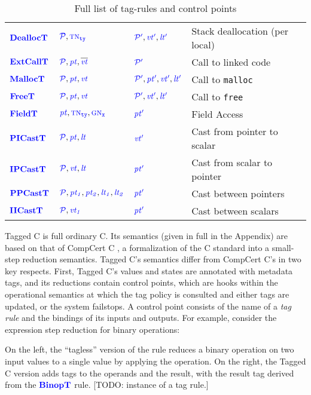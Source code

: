 \documentclass{llncs}
\begin{document}
\begin{table}[t]
\begin{tabular}{|l|l|l|l|}
    \(\dealloctname\)   & \(\dealloctargs\)      & \(\dealloctres\)   & Stack deallocation (per local) \\
    \(\extcalltname\)   & \(\extcalltargs\)      & \(\extcalltres\)   & Call to linked code \\
    \(\malloctname\)    & \(\malloctargs\)       & \(\malloctres\)    & Call to {\tt malloc} \\
    \(\freetname\)      & \(\freetargs\)         & \(\freetres\)      & Call to {\tt free} \\
    \(\fieldtname\)     & \(\fieldtargs\)        & \(\fieldtres\)     & Field Access \\
    \(\picasttname\)    & \(\picasttargs\)       & \(\picasttres\)    & Cast from pointer to scalar \\
    \(\ipcasttname\)    & \(\ipcasttargs\)       & \(\ipcasttres\)    & Cast from scalar to pointer \\
    \(\ppcasttname\)    & \(\ppcasttargs\)       & \(\ppcasttres\)    & Cast between pointers \\
    \(\iicasttname\)    & \(\iicasttargs\)       & \(\iicasttres\)    & Cast between scalars \\
    \hline
  \end{tabular}

  \caption{Full list of tag-rules and control points}
  \label{fig:controlpoints}
\end{table}

Tagged C is full ordinary C.
Its semantics (given in full in the Appendix)
are based on that of CompCert C \cite{Leroy09:CompCert},
a formalization of the C standard into a small-step reduction semantics.
Tagged C's semantics differ from CompCert C's in two key respects. First, Tagged C's values
and states are annotated with metadata tags, and its reductions contain
control points, which are hooks within the
operational semantics at which the tag policy is consulted and either tags are updated, or the system
failstops. A control point consists of the name of a {\em tag rule}
and the bindings of its inputs and outputs. For example, consider the expression step reduction
for binary operations:

\begin{minipage}[t]{0.37\textwidth}
  \binopsteptagless
\end{minipage}
\begin{minipage}[t]{0.6\textwidth}
  \binopstep
\end{minipage}

\noindent
On the left, the ``tagless'' version of the rule reduces a
binary operation on two input values to a single value by applying the operation.
On the right, the Tagged C version adds tags to the operands and the result, with the result tag
derived from the \(\binoptname\) rule. [TODO: instance of a tag rule.]
\end{document}
